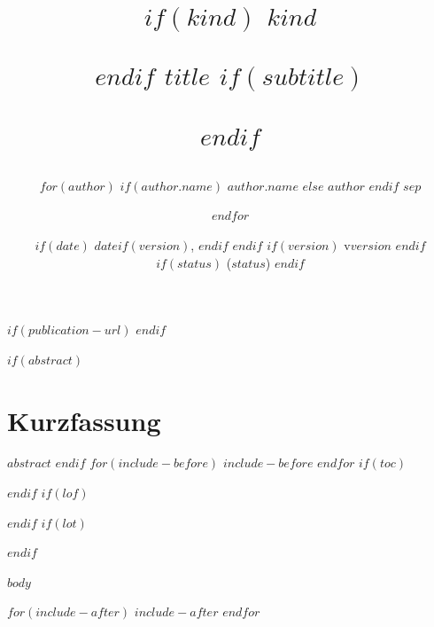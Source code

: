 \documentclass[
$if(fontsize)$
  $fontsize$,
$endif$
$if(papersize)$
  $papersize$paper,
$endif$
$if(babel-lang)$
  $babel-lang$,
$endif$
$for(classoption)$
  $classoption$$sep$,
$endfor$
]{book}
\title{%
$if(kind)$
  {\small\itshape $kind$}\par\medskip
$endif$
  $title$
$if(subtitle)$
  \par\medskip{\large $subtitle$}
$endif$
}
\author{%
$for(author)$
$if(author.name)$
  $author.name$
$else$
  $author$
$endif$
$sep$\and
$endfor$
}
\date{%
$if(date)$
  $date$$if(version)$, $endif$
$endif$
$if(version)$
  v$version$
$endif$
$if(status)$
  \space($status$)
$endif$
}
\begin{document}
\frontmatter
$if(publication-url)$
$endif$
\maketitle
$if(abstract)$
\chapter*{Kurzfassung}
$abstract$
$endif$
$for(include-before)$
$include-before$
$endfor$
$if(toc)$
\clearpage
\setcounter{tocdepth}{$toc-depth$}
\tableofcontents
\clearpage
\markboth{}{}
$endif$
$if(lof)$
\listoffigures
$endif$
$if(lot)$
\listoftables
$endif$

$body$

$for(include-after)$
$include-after$
$endfor$
\end{document}
